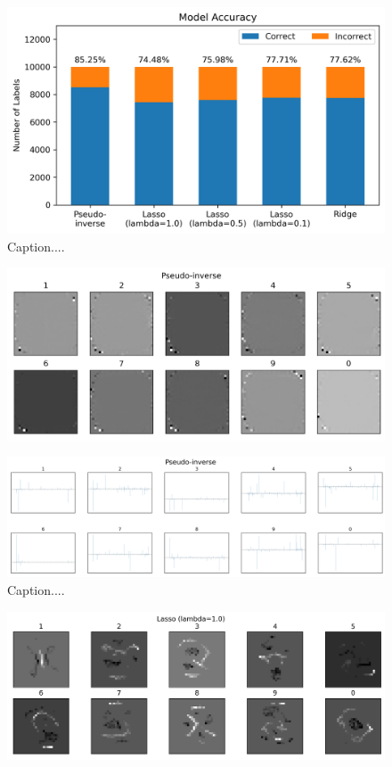 \documentclass[10pt]{article}
\begin{document}
\begin{figure}[ht]
\centerline{\includegraphics[scale=0.75]{figures/all_data_accuracy_comparison.png}}
\caption{Caption....}
\label{fig3}
\end{figure}

\begin{figure}[ht]
\centerline{\includegraphics[scale=0.8]{figures/weight_matrix_pinv.png}}
\label{fig4a}
\end{figure}

\begin{figure}[ht]
\centerline{\includegraphics[scale=0.5]{figures/bar_plot_loadings_pinv.png}}
\caption{Caption....}
\label{fig4b}
\end{figure}

\begin{figure}[ht]
\centerline{\includegraphics[scale=0.8]{figures/weight_matrix_lasso_1.png}}
\label{fig5a}
\end{figure}
\end{document}
